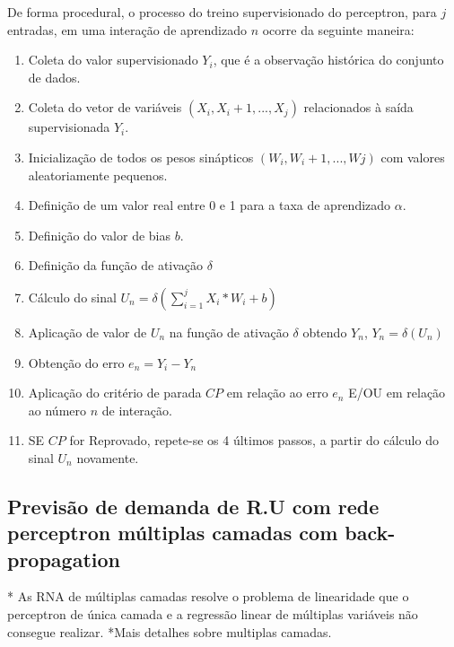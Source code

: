 \documentclass[	12pt, Times, openright, twoside, a4paper, english, brazil]{abntex2}
\begin{document}
            De forma procedural, o processo do treino supervisionado do perceptron, para $j$ entradas, em uma interação de aprendizado $n$ ocorre da seguinte maneira: 
            \begin{enumerate}
              \item Coleta do valor supervisionado $Y_i$, que é a observação histórica do conjunto de dados.
              \item Coleta do vetor de variáveis $(X_i, X_i+1, ..., X_j)$ relacionados à saída supervisionada $Y_i$.
              \item Inicialização de todos os pesos sinápticos $(W_i, W_i+1, ..., Wj)$ com valores aleatoriamente pequenos.
              \item Definição de um valor real entre 0 e 1 para a taxa de aprendizado $\alpha$.
              \item Definição do valor de bias $b$.
              \item Definição da função de ativação $\delta$ 
              \item Cálculo do sinal $U_n = \delta(\sum_{i=1}^{j}X_i*W_i+b)$
              \item Aplicação de valor de $U_n$ na função de ativação $\delta$ obtendo $Y_n$, $Y_n = \delta(U_n)$
              \item Obtenção do erro $e_n = Y_i-Y_n$
              \item Aplicação do critério de parada $CP$ em relação ao erro $e_n$ E/OU em relação ao número $n$ de interação.
              \item SE $CP$ for Reprovado, repete-se os 4 últimos passos, a partir do cálculo do sinal $U_n$ novamente. 
            \end{enumerate}
            
            
        \subsection{Previsão de demanda de R.U com rede perceptron múltiplas camadas com back-propagation}
          * As RNA de múltiplas camadas resolve o problema de linearidade que o perceptron de única camada e a regressão linear de múltiplas variáveis não consegue realizar. 
          *Mais detalhes sobre multiplas camadas.
\end{document}
